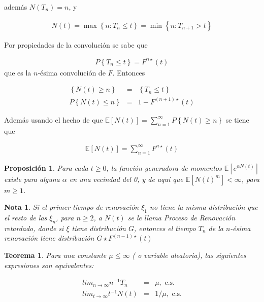 \documentclass{article}
\newtheorem{Teo}{Teorema}
\newtheorem{Note}{Nota}
\newtheorem{Prop}{Proposición}
\newcommand{\esp}{\mathbb{E}}
\begin{document}
adem\'as $N\left(T_{n}\right)=n$, y 

\begin{eqnarray*}
N\left(t\right)=\max\left\{n:T_{n}\leq t\right\}=\min\left\{n:T_{n+1}>t\right\}
\end{eqnarray*}

Por propiedades de la convoluci\'on se sabe que

\begin{eqnarray*}
P\left\{T_{n}\leq t\right\}=F^{n\star}\left(t\right)
\end{eqnarray*}
que es la $n$-\'esima convoluci\'on de $F$. Entonces 

\begin{eqnarray*}
\left\{N\left(t\right)\geq n\right\}&=&\left\{T_{n}\leq t\right\}\\
P\left\{N\left(t\right)\leq n\right\}&=&1-F^{\left(n+1\right)\star}\left(t\right)
\end{eqnarray*}

Adem\'as usando el hecho de que $\esp\left[N\left(t\right)\right]=\sum_{n=1}^{\infty}P\left\{N\left(t\right)\geq n\right\}$
se tiene que

\begin{eqnarray*}
\esp\left[N\left(t\right)\right]=\sum_{n=1}^{\infty}F^{n\star}\left(t\right)
\end{eqnarray*}

\begin{Prop}
Para cada $t\geq0$, la funci\'on generadora de momentos $\esp\left[e^{\alpha N\left(t\right)}\right]$ existe para alguna $\alpha$ en una vecindad del 0, y de aqu\'i que $\esp\left[N\left(t\right)^{m}\right]<\infty$, para $m\geq1$.
\end{Prop}


\begin{Note}
Si el primer tiempo de renovaci\'on $\xi_{1}$ no tiene la misma distribuci\'on que el resto de las $\xi_{n}$, para $n\geq2$, a $N\left(t\right)$ se le llama Proceso de Renovaci\'on retardado, donde si $\xi$ tiene distribuci\'on $G$, entonces el tiempo $T_{n}$ de la $n$-\'esima renovaci\'on tiene distribuci\'on $G\star F^{\left(n-1\right)\star}\left(t\right)$
\end{Note}


\begin{Teo}
Para una constante $\mu\leq\infty$ ( o variable aleatoria), las siguientes expresiones son equivalentes:

\begin{eqnarray}
lim_{n\rightarrow\infty}n^{-1}T_{n}&=&\mu,\textrm{ c.s.}\\
lim_{t\rightarrow\infty}t^{-1}N\left(t\right)&=&1/\mu,\textrm{ c.s.}
\end{eqnarray}
\end{Teo}
\end{document}

